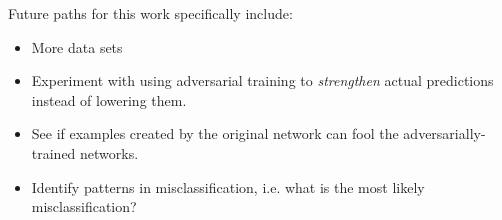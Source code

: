 \documentclass[12pt]{article}
\begin{document}
Future paths for this work specifically include:
\begin{itemize}
	\item More data sets
	\item Experiment with using adversarial training to \emph{strengthen} actual predictions instead of lowering them.
	\item See if examples created by the original network can fool the adversarially-trained networks.
	\item Identify patterns in misclassification, i.e. what is the most likely misclassification?
\end{itemize}



\end{document}
